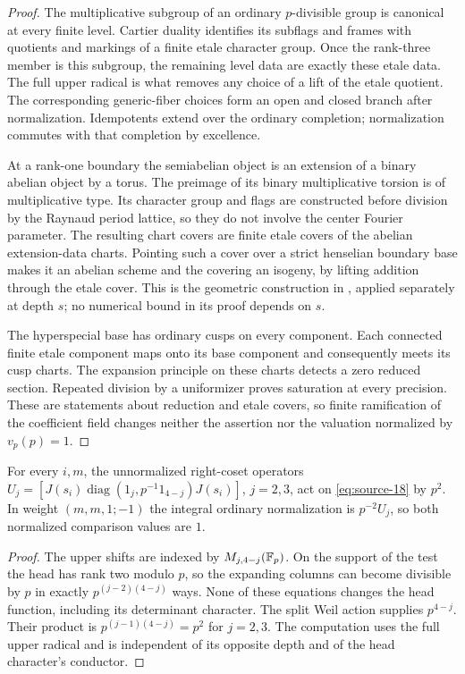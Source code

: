 \begin{proof}
The multiplicative subgroup of an ordinary $p$-divisible group is
canonical at every finite level.  Cartier duality identifies its
subflags and frames with quotients and markings of a finite etale
character group.  Once the rank-three member is this subgroup, the
remaining level data are exactly these etale data.  The full upper
radical is what removes any choice of a lift of the etale quotient.
The corresponding generic-fiber choices form an open and closed
branch after normalization.  Idempotents extend over the ordinary
completion; normalization commutes with that completion by
excellence.

At a rank-one boundary the semiabelian object is an extension of a
binary abelian object by a torus.  The preimage of its binary
multiplicative torsion is of multiplicative type.  Its character
group and flags are constructed before division by the Raynaud
period lattice, so they do not involve the center Fourier
parameter.  The resulting chart covers are finite etale covers of
the abelian extension-data charts.  Pointing such a cover over a
strict henselian boundary base makes it an abelian scheme and the
covering an isogeny, by lifting addition through the etale cover.
This is the geometric construction in
\cite[Lemma 7.1]{C}, applied
separately at depth $s$; no numerical bound in its proof depends on
$s$.

The hyperspecial base has ordinary cusps on every component.
Each connected finite etale component maps onto its base component
and consequently meets its cusp charts.  The expansion principle
on these charts detects a zero reduced section.  Repeated division
by a uniformizer proves saturation at every precision.  These are
statements about reduction and etale covers, so finite ramification
of the coefficient field changes neither the assertion nor the
valuation normalized by $v_p(p)=1$.
\end{proof}

\begin{lemma}\label{theta:p-operators}
For every $i,m$, the unnormalized right-coset operators
$U_j=[J(s_i)\operatorname{diag}(1_j,p^{-1}1_{4-j})J(s_i)]$,
$j=2,3$, act on \eqref{eq:source-18} by $p^2$.  In weight
$(m,m,1;-1)$ the integral ordinary normalization is $p^{-2}U_j$,
so both normalized comparison values are $1$.
\end{lemma}

\begin{proof}
The upper shifts are indexed by $M_{j,4-j}(\mathbb F_p)$.  On the support
of the test the head has rank two modulo $p$, so the expanding
columns can become divisible by $p$ in exactly
$p^{(j-2)(4-j)}$ ways.  None of these equations changes the head
function, including its determinant character.  The split Weil
action supplies $p^{4-j}$.  Their product is
$p^{(j-1)(4-j)}=p^2$ for $j=2,3$.  The computation uses the full
upper radical and is independent of its opposite depth and of
the head character's conductor.
\end{proof}


